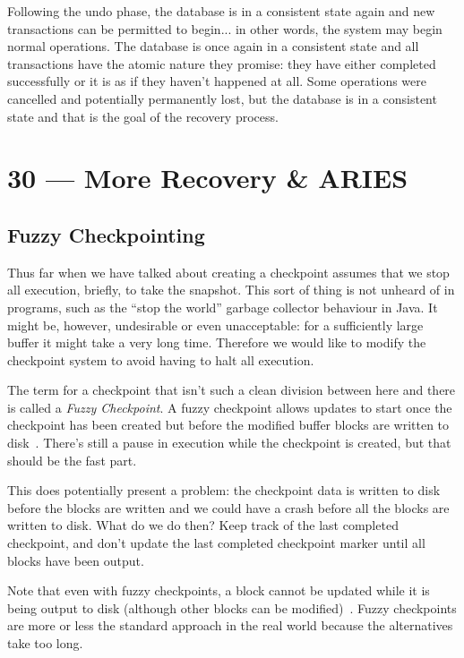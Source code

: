 \documentclass[a4paper]{report}
\begin{document}
Following the undo phase, the database is in a consistent state again and new transactions can be permitted to begin... in other words, the system may begin normal operations. The database is once again in a consistent state and all transactions have the atomic nature they promise: they have either completed successfully or it is as if they haven't happened at all. Some operations were cancelled and potentially permanently lost, but the database is in a consistent state and that is the goal of the recovery process.









\chapter*{30 --- More Recovery \& ARIES}


\section*{Fuzzy Checkpointing}

Thus far when we have talked about creating a checkpoint assumes that we stop all execution, briefly, to take the snapshot. This sort of thing is not unheard of in programs, such as the ``stop the world'' garbage collector behaviour in Java. It might be, however, undesirable or even unacceptable: for a sufficiently large buffer it might take a very long time. Therefore we would like to modify the checkpoint system to avoid having to halt all execution.

The term for a checkpoint that isn't such a clean division between here and there is called a \textit{Fuzzy Checkpoint}. A fuzzy checkpoint allows updates to start once the checkpoint has been created but before the modified buffer blocks are written to disk~\cite{fds}. There's still a pause in execution while the checkpoint is created, but that should be the fast part.

This does potentially present a problem: the checkpoint data is written to disk before the blocks are written and we could have a crash before all the blocks are written to disk. What do we do then? Keep track of the last completed checkpoint, and don't update the last completed checkpoint marker until all blocks have been output.

Note that even with fuzzy checkpoints, a block cannot be updated while it is being output to disk (although other blocks can be modified)~\cite{dsc}. Fuzzy checkpoints are more or less the standard approach in the real world because the alternatives take too long.
\end{document}
